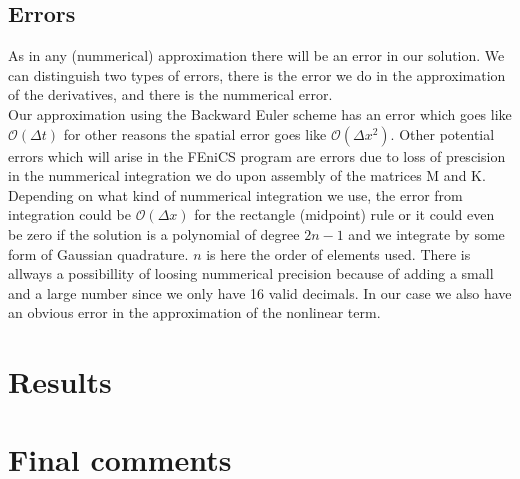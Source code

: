 \documentclass[a4paper,english, 10pt, twoside]{article}
\begin{document}
\subsection*{Errors}
As in any (nummerical) approximation there will be an error in our solution. We can distinguish two types of errors, there is the error we do in 
the approximation of the derivatives, and there is the nummerical error.\\
Our approximation using the Backward Euler scheme has an error which goes like $\mathcal{O}(\Delta t)$ for other reasons the spatial error goes 
like $\mathcal{O}(\Delta x^2)$. Other potential errors which will arise in the FEniCS program are errors due to loss of prescision in the 
nummerical integration we do upon assembly of the matrices M and K. Depending on what kind of nummerical integration we use, the error from integration 
could be $\mathcal{O}(\Delta x)$ for the rectangle (midpoint) rule or it could even be zero if the solution is a polynomial of degree $2n-1$ 
and we integrate by some form of Gaussian quadrature. $n$ is here the order of elements used.
There is allways a possibillity of loosing nummerical precision because of adding a small and a large number since we only have 16 valid decimals.
In our case we also have an obvious error in the approximation of the nonlinear term. 

\section*{Results}

\section*{Final comments}
\end{document}

